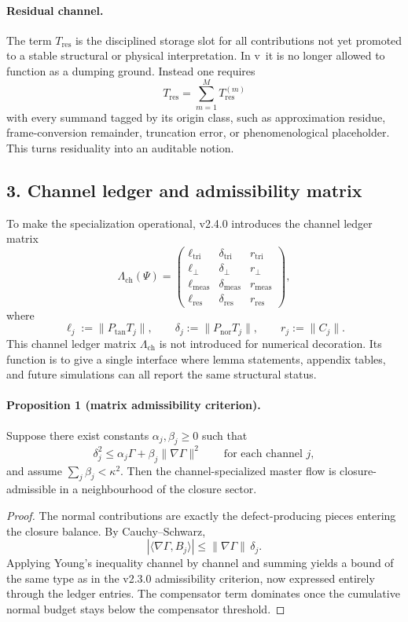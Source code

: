 \paragraph{Residual channel.}
The term $T_{\mathrm{res}}$ is the disciplined storage slot for all contributions not
yet promoted to a stable structural or physical interpretation. In v\docversion\ it is no longer allowed to function as a dumping ground. Instead one requires
\[
T_{\mathrm{res}} = \sum_{m=1}^M T_{\mathrm{res}}^{(m)}
\]
with every summand tagged by its origin class, such as approximation residue,
frame-conversion remainder, truncation error, or phenomenological placeholder.
This turns residuality into an auditable notion.

\subsection*{3. Channel ledger and admissibility matrix}
To make the specialization operational, v2.4.0 introduces the channel
ledger matrix
\[
\Lambda_{\mathrm{ch}}(\Psi)=
\begin{pmatrix}
\ell_{\mathrm{tri}} & \delta_{\mathrm{tri}} & r_{\mathrm{tri}}\\
\ell_{\perp} & \delta_{\perp} & r_{\perp}\\
\ell_{\mathrm{meas}} & \delta_{\mathrm{meas}} & r_{\mathrm{meas}}\\
\ell_{\mathrm{res}} & \delta_{\mathrm{res}} & r_{\mathrm{res}}
\end{pmatrix},
\]
where
\[
\ell_j := \|P_{\mathrm{tan}}T_j\|,
\qquad
\delta_j := \|P_{\mathrm{nor}}T_j\|,
\qquad
r_j := \|C_j\|.
\]
This channel ledger matrix $\Lambda_{\mathrm{ch}}$ is not introduced for numerical decoration. Its function is to give a
single interface where lemma statements, appendix tables, and future simulations
can all report the same structural status.

\paragraph{Proposition 1 (matrix admissibility criterion).}
Suppose there exist constants $\alpha_j,\beta_j\ge0$ such that
\[
\delta_j^2 \le \alpha_j \Gamma + \beta_j \|\nabla\Gamma\|^2
\qquad\text{for each channel }j,
\]
and assume $\sum_j \beta_j < \kappa^2$. Then the channel-specialized master flow is
closure-admissible in a neighbourhood of the closure sector.

\begin{proof}
The normal contributions are exactly the defect-producing pieces entering the
closure balance. By Cauchy--Schwarz,
\[
|\langle \nabla\Gamma, B_j\rangle|
\le \|\nabla\Gamma\|\,\delta_j.
\]
Applying Young's inequality channel by channel and summing yields a bound of the
same type as in the v2.3.0 admissibility criterion, now expressed entirely through
the ledger entries. The compensator term dominates once the cumulative normal
budget stays below the compensator threshold.
\end{proof}

